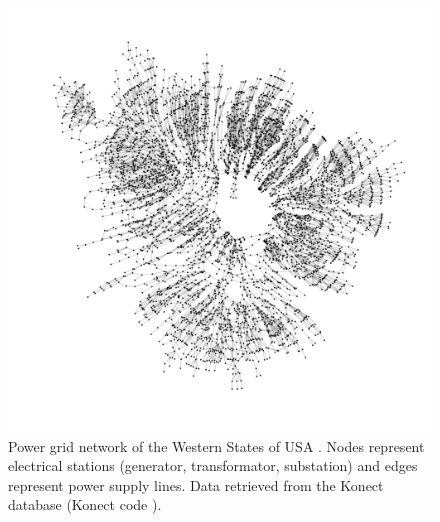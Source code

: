 \documentclass[
11pt, %
english, %
singlespacing, %
nolistspacing, %
liststotoc, %
headsepline, %
]{MastersDoctoralThesis} %
\begin{document}
\begin{figure}
	\includegraphics[width=\textwidth]{network-US-power-grid.pdf}
	\caption{Power grid network of the Western States of USA \cite{watts1998collective}. Nodes represent electrical stations (generator, transformator, substation) and edges represent power supply lines. Data retrieved from the Konect database \cite{kunegis2013konect} (Konect code ).}
	\label{Figure: Network of western US powergrid}
\end{figure}
\end{document}
